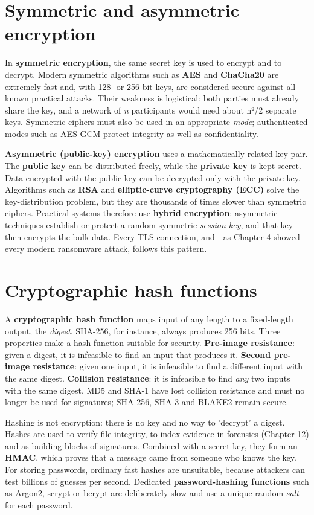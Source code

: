 \section{Symmetric and asymmetric encryption}\label{sec:7.1}
In \textbf{symmetric encryption}, the same secret key is used to encrypt and to decrypt. Modern symmetric algorithms such as \textbf{AES} and \textbf{ChaCha20} are extremely fast and, with 128- or 256-bit keys, are considered secure against all known practical attacks. Their weakness is logistical: both parties must already share the key, and a network of \emph{n} participants would need about n²/2 separate keys. Symmetric ciphers must also be used in an appropriate \emph{mode}; authenticated modes such as AES-GCM protect integrity as well as confidentiality.

\textbf{Asymmetric (public-key) encryption} uses a mathematically related key pair. The \textbf{public key} can be distributed freely, while the \textbf{private key} is kept secret. Data encrypted with the public key can be decrypted only with the private key. Algorithms such as \textbf{RSA} and \textbf{elliptic-curve cryptography (ECC)} solve the key-distribution problem, but they are thousands of times slower than symmetric ciphers. Practical systems therefore use \textbf{hybrid encryption}: asymmetric techniques establish or protect a random symmetric \emph{session key}, and that key then encrypts the bulk data. Every TLS connection, and—as Chapter 4 showed—every modern ransomware attack, follows this pattern.

\section{Cryptographic hash functions}\label{sec:7.2}
A \textbf{cryptographic hash function} maps input of any length to a fixed-length output, the \emph{digest}. SHA-256, for instance, always produces 256 bits. Three properties make a hash function suitable for security. \textbf{Pre-image resistance}: given a digest, it is infeasible to find an input that produces it. \textbf{Second pre-image resistance}: given one input, it is infeasible to find a different input with the same digest. \textbf{Collision resistance}: it is infeasible to find \emph{any} two inputs with the same digest. MD5 and SHA-1 have lost collision resistance and must no longer be used for signatures; SHA-256, SHA-3 and BLAKE2 remain secure.

Hashing is not encryption: there is no key and no way to 'decrypt' a digest. Hashes are used to verify file integrity, to index evidence in forensics (Chapter 12) and as building blocks of signatures. Combined with a secret key, they form an \textbf{HMAC}, which proves that a message came from someone who knows the key. For storing passwords, ordinary fast hashes are unsuitable, because attackers can test billions of guesses per second. Dedicated \textbf{password-hashing functions} such as Argon2, scrypt or bcrypt are deliberately slow and use a unique random \emph{salt} for each password.

